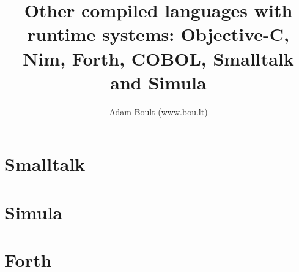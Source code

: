 \documentclass[oneside]{book}
\begin{document}
\author{Adam Boult (www.bou.lt)}
\title{Other compiled languages with runtime systems: Objective-C, Nim, Forth, COBOL, Smalltalk and Simula}
\maketitle

\setcounter{tocdepth}{0}
\tableofcontents



\part{Smalltalk}

\part{Simula}

\part{Forth}

\end{document}
